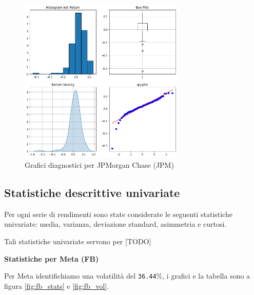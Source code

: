 \documentclass{article}
\begin{document}
\begin{figure}[h]
  \centering
  \includegraphics[width=0.7\textwidth]{jpm_diagn.png}
  \caption{Grafici diagnostici per JPMorgan Chase (JPM)}
  \label{fig:jpm_diagn}
\end{figure}

\pagebreak

\subsection{Statistiche descrittive univariate}

Per ogni serie di rendimenti sono state considerate le seguenti statistiche univariate: media, varianza, deviazione standard, asimmetria e curtosi.

Tali statistiche univariate servono per [TODO]

\textbf{Statistiche per Meta (FB)}

Per Meta identifichiamo una volatilità del \verb|36.44|\%, i grafici e la tabella sono a figura \ref{fig:fb_stats} e \ref{fig:fb_vol}.
\end{document}
